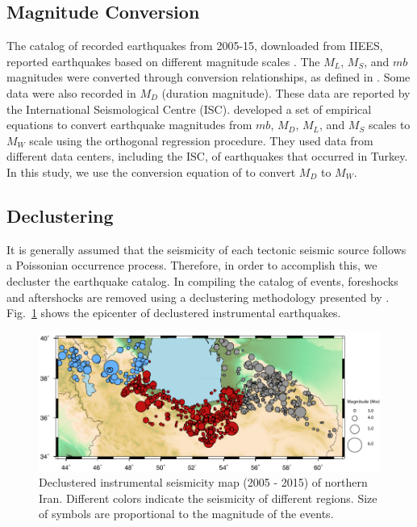 \subsection{Magnitude Conversion}
\noindent
The catalog of recorded earthquakes from 2005-15, downloaded from IIEES, reported earthquakes based on different magnitude scales \citep{IIEES}. The  $M_L$,  $M_S$, and  $mb$  magnitudes were converted through conversion relationships, as defined in  \citet{Zare2014}. Some data were also recorded in  $M_D$  (duration magnitude). These data are reported by the International Seismological Centre (ISC).   \citet{Deniz2010}  developed a set of empirical equations to convert earthquake magnitudes from  $mb$,  $M_D$,  $M_L$, and  $M_S$  scales to  $M_W$  scale using the orthogonal regression procedure. They used data from different data centers, including the ISC, of earthquakes that occurred in Turkey. In this study, we use the conversion equation of  \citet{Deniz2010}  to convert  $M_D$  to  $M_W$. 

\subsection{Declustering} 
\noindent
It is generally assumed that the seismicity of each tectonic seismic source follows a Poissonian occurrence process. Therefore, in order to accomplish this, we decluster the earthquake catalog. In compiling the catalog of events, foreshocks and aftershocks are removed using a declustering methodology  presented by \citet{Gardner1974}. Fig.~\ref{fig:seismicity}  shows the epicenter of declustered instrumental  earthquakes.

\begin{figure} [ht]
\centering
\includegraphics[scale=1]{figures/pdf/Figure04.pdf} 
\caption{Declustered instrumental seismicity map (2005 - 2015) of northern Iran. Different colors indicate the seismicity of different regions. Size of symbols are proportional to the magnitude of the events.}
\label{fig:seismicity}
\end{figure}


